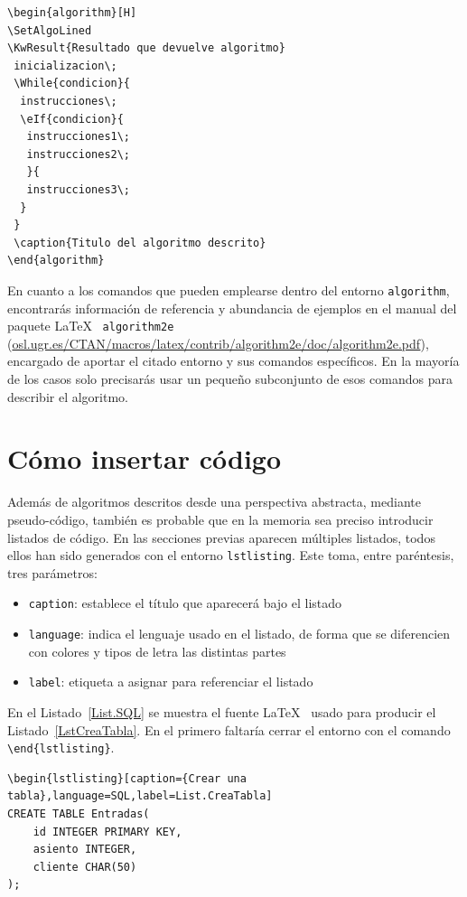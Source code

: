 \begin{lstlisting}[language={[LaTeX]TeX},caption={Descripción de un algoritmo},label=List.Algoritmo]
\begin{algorithm}[H]
\SetAlgoLined
\KwResult{Resultado que devuelve algoritmo}
 inicializacion\;
 \While{condicion}{
  instrucciones\;
  \eIf{condicion}{
   instrucciones1\;
   instrucciones2\;
   }{
   instrucciones3\;
  }
 }
 \caption{Titulo del algoritmo descrito}
\end{algorithm}
\end{lstlisting}

En cuanto a los comandos que pueden emplearse dentro del entorno \verb|algorithm|, encontrarás información de referencia y abundancia de ejemplos en el manual del paquete \LaTeX~ \texttt{algorithm2e} (\url{osl.ugr.es/CTAN/macros/latex/contrib/algorithm2e/doc/algorithm2e.pdf}), encargado de aportar el citado entorno y sus comandos específicos. En la mayoría de los casos solo precisarás usar un pequeño subconjunto de esos comandos para describir el algoritmo.

\section{Cómo insertar código}

Además de algoritmos descritos desde una perspectiva abstracta, mediante pseudo-código, también es probable que en la memoria sea preciso introducir listados de código. En las secciones previas aparecen múltiples listados, todos ellos han sido generados con el entorno \verb|lstlisting|. Este toma, entre paréntesis, tres parámetros:

\begin{itemize}
    \item \texttt{caption}: establece el título que aparecerá bajo el listado
    \item \texttt{language}: indica el lenguaje usado en el listado, de forma que se diferencien con colores y tipos de letra las distintas partes
    \item \texttt{label}: etiqueta a asignar para referenciar el listado
\end{itemize}

En el Listado~\ref{List.SQL} se muestra el fuente \LaTeX~ usado para producir el Listado~\ref{LstCreaTabla}. En el primero faltaría cerrar el entorno con el comando \verb*|\end{lstlisting}|.

\begin{lstlisting}[caption={Fuente LaTeX que genera el listado en lenguaje SQL},language={[LaTeX]TeX},label=List.SQL]
\begin{lstlisting}[caption={Crear una tabla},language=SQL,label=List.CreaTabla]
CREATE TABLE Entradas(
    id INTEGER PRIMARY KEY,
    asiento INTEGER,
    cliente CHAR(50)
);
\end{lstlisting}


